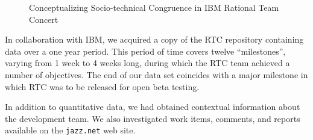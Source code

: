 \begin{figure}

  \caption{Conceptualizing Socio-technical Congruence in IBM Rational Team Concert}
  \label{fig:constructing}
\end{figure}

In collaboration with IBM, we acquired a copy of the RTC repository containing data over a one year period.
This period of time covers twelve ``milestones'', varying from 1 week to 4 weeks long, during which the RTC team achieved a number of objectives. The end of our data set coincides with a major milestone in which RTC was to be released for open beta testing. 

In addition to quantitative data, we had obtained contextual information about the development team. We also investigated work items, comments, and reports available on the \texttt{jazz.net} web site.

